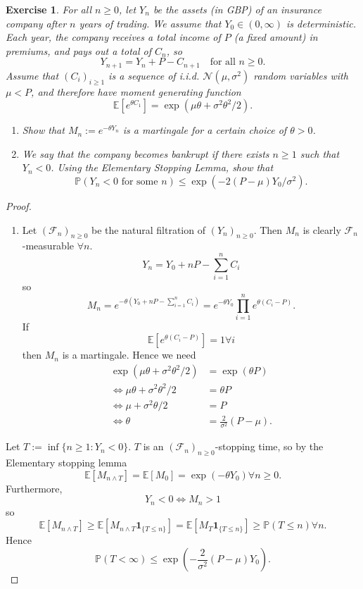 \documentclass{article}
\newtheorem{exercise}[theorem]{Exercise}
\begin{document}
\begin{exercise}
For all $n \geq 0$, let $Y_n$ be the assets (in GBP) of an insurance company after $n$ years of trading. We assume that $Y_0 \in (0, \infty)$ is deterministic. Each year, the company receives a total income of $P$ (a fixed amount) in premiums, and pays out a total of $C_n$, so
\[
Y_{n+1} = Y_n + P - C_{n+1} \quad \text{for all } n \geq 0.
\]
Assume that $(C_i)_{i \geq 1}$ is a sequence of i.i.d. $\mathcal{N}(\mu, \sigma^2)$ random variables with $\mu < P$, and therefore have moment generating function
\[
\mathbb{E}[e^{\theta C_1}] = \exp(\mu \theta + \sigma^2 \theta^2 / 2). \tag{1}
\]

\begin{enumerate}
    \item[(i)] Show that $M_n := e^{-\theta Y_n}$ is a martingale for a certain choice of $\theta > 0$.
    
    \item[(ii)] We say that the company becomes bankrupt if there exists $n \geq 1$ such that $Y_n < 0$. Using the Elementary Stopping Lemma, show that
    \[
    \mathbb{P}(Y_n < 0 \text{ for some } n) \leq \exp(-2(P - \mu)Y_0 / \sigma^2).
    \]
\end{enumerate}
\end{exercise}
\begin{proof}
\begin{enumerate}
\item[(i)] Let $(\mathcal{F}_n)_{n\geq0}$ be the natural filtration of $(Y_n)_{n\geq0}$. Then $M_n$ is clearly $\mathcal{F}_n$-measurable $\forall n$.\[Y_n=Y_0+nP-\sum_{i=1}^nC_i\]so\[M_n=e^{-\theta(Y_0+nP-\sum_{i=1}^nC_i)}=e^{-\theta Y_0}\prod_{i=1}^ne^{\theta(C_i-P)}.\] If \[\mathbb{E}[e^{\theta(C_i-P)}]=1\forall i\] then $M_n$ is a martingale. Hence we need\begin{align*}
\exp(\mu\theta+\sigma^2\theta^2/2)&=\exp(\theta P)\\\iff\mu\theta+\sigma^2\theta^2/2&=\theta P\\\iff\mu+\sigma^2\theta/2&=P\\\iff\theta&=\frac{2}{\sigma^2}(P-\mu).
\end{align*}
\end{enumerate}
\item[(ii)] Let $T:=\inf\{n\geq1:Y_n<0\}$. $T$ is an $(\mathcal{F}_n)_{n\geq0}$-stopping time, so by the Elementary stopping lemma\[\mathbb{E}[M_{n\wedge T}]=\mathbb{E}[M_0]=\exp(-\theta Y_0)\forall n\geq0.\]Furthermore,\[Y_n<0\iff M_n>1\]so\[\mathbb{E}[M_{n\wedge T}]\geq\mathbb{E}[M_{n\wedge T}\mathbf{1}_{\{T\leq n\}}]=\mathbb{E}[M_T\mathbf{1}_{\{T\leq n\}}]\geq\mathbb{P}(T\leq n)\forall n.\]Hence\[\mathbb{P}(T<\infty)\leq\exp\left(-\frac{2}{\sigma^2}(P-\mu)Y_0\right).\]
\end{proof}
\end{document}
